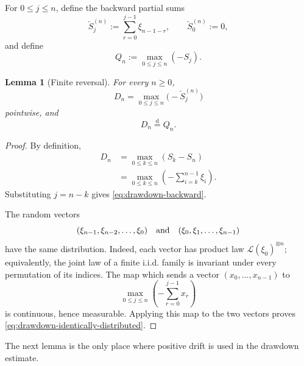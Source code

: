 \documentclass[10pt,reqno,a4paper]{amsart}
\numberwithin{equation}{section}
\theoremstyle{plain}
\newtheorem{lemma}[theorem]{Lemma}
\theoremstyle{definition}
\theoremstyle{remark}
\newcommand{\1}{\mathbf{1}}
\begin{document}
For $0\leq j\leq n$, define the backward partial sums
\begin{equation}\label{eq:backward-sums}
  \overleftarrow S_j^{(n)}
  :=
  \sum_{r=0}^{j-1}\xi_{n-1-r},
  \qquad
  \overleftarrow S_0^{(n)}:=0,
\end{equation}
and define
\begin{equation}\label{eq:negative-maximum}
  Q_n:=\max_{0\leq j\leq n}(-S_j).
\end{equation}

\begin{lemma}[Finite reversal]\label{lem:finite-reversal}
  For every $n\geq0$,
  \begin{equation}\label{eq:drawdown-backward}
    D_n
    =
    \max_{0\leq j\leq n}\bigl(-\overleftarrow S_j^{(n)}\bigr)
  \end{equation}
  pointwise, and
  \begin{equation}\label{eq:drawdown-identically-distributed}
    D_n\stackrel{\mathrm d}=Q_n.
  \end{equation}
\end{lemma}

\begin{proof}
  By definition,
  \begin{align*}
    D_n
    &=\max_{0\leq k\leq n}(S_k-S_n)\\
    &=\max_{0\leq k\leq n}
      \left(-\sum_{i=k}^{n-1}\xi_i\right).
  \end{align*}
  Substituting $j=n-k$ gives \cref{eq:drawdown-backward}.

  The random vectors
  \begin{equation*}
    (\xi_{n-1},\xi_{n-2},\ldots,\xi_0)
    \quad\hbox{and}\quad
    (\xi_0,\xi_1,\ldots,\xi_{n-1})
  \end{equation*}
  have the same distribution.  Indeed, each vector has product law
  $\mathcal L(\xi_0)^{\otimes n}$; equivalently, the joint law of a finite
  i.i.d. family is invariant under every permutation of its indices.  The
  map which sends a vector $(x_0,\ldots,x_{n-1})$ to
  \begin{equation*}
    \max_{0\leq j\leq n}
    \left(-\sum_{r=0}^{j-1}x_r\right)
  \end{equation*}
  is continuous, hence measurable.  Applying this map to the two vectors
  proves \cref{eq:drawdown-identically-distributed}.
\end{proof}

The next lemma is the only place where positive drift is used in the
drawdown estimate.
\end{document}
